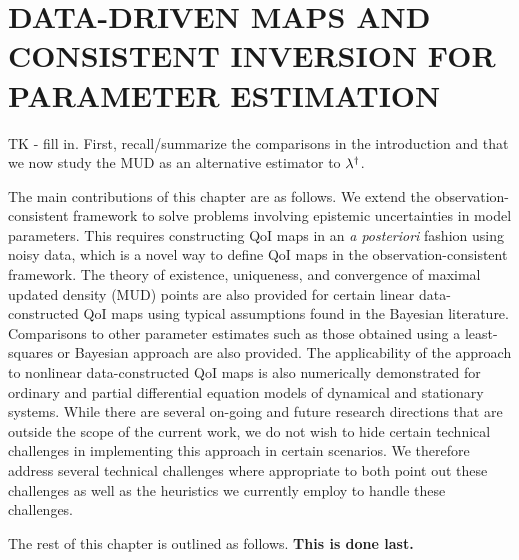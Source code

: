 \chapter{\uppercase{Data-Driven Maps and Consistent Inversion For Parameter Estimation} \label{chapter:04}}

TK - fill in. First, recall/summarize the comparisons in the introduction and that we now study the MUD as an alternative estimator to $\lambda^\dagger$.

The main contributions of this chapter are as follows.
We extend the observation-consistent framework to solve problems involving epistemic uncertainties in model parameters.
This requires constructing QoI maps in an {\em a posteriori} fashion using noisy data, which is a novel way to define QoI maps in the observation-consistent framework.
The theory of existence, uniqueness, and convergence of maximal updated density (MUD) points are also provided for certain linear data-constructed QoI maps using typical assumptions found in the Bayesian literature.
Comparisons to other parameter estimates such as those obtained using a least-squares or Bayesian approach are also provided.
The applicability of the approach to nonlinear data-constructed QoI maps is also numerically demonstrated for ordinary and partial differential equation models of dynamical and stationary systems.
While there are several on-going and future research directions that are outside the scope of the current work, we do not wish to hide certain technical challenges in implementing this approach in certain scenarios.
We therefore address several technical challenges where appropriate to both point out these challenges as well as the heuristics we currently employ to handle these challenges.


The rest of this chapter is outlined as follows.
{\bf This is done last.}


